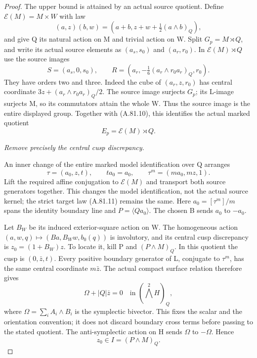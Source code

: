 \begin{proof}
The upper bound is attained by an actual source quotient.
Define \(\mathcal E(M)=M\times W\) with law
\[
                 (a,z)(b,w)=(a+b,z+w+\tfrac12(a\wedge b)_Q),
 \tag{A.81.11}
\]
and give Q its natural action on M and trivial action on
W. Split \(G_p=M\rtimes Q\), and write its actual
source elements as \((a_s,s_0)\) and \((a_r,r_0)\).
In \(\mathcal E(M)\rtimes Q\) use the source images
\[
 S=(a_s,0,s_0),\qquad
 R=(a_r,-\tfrac16(a_r\wedge r_0a_r)_Q,r_0).
 \tag{A.81.12}
\]
They have orders two and three. Indeed the cube of
\((a_r,z,r_0)\) has central coordinate
\(3z+(a_r\wedge r_0a_r)_Q/2\). The source image
surjects \(G_p\); its L-image surjects M, so its
commutators attain the whole W. Thus the source image is
the entire displayed group. Together with (A.81.10),
this identifies the actual marked quotient
\[
                         E_p=\mathcal E(M)\rtimes Q.
 \tag{A.81.13}
\]

\emph{Remove precisely the central cusp discrepancy.}\par
An inner change of the entire marked model identification
over Q arranges
\[
             \tau=(a_0,z,t),\qquad ta_0=a_0,
             \qquad \tau^m=(ma_0,mz,1).
 \tag{A.81.14}
\]
Lift the required affine conjugation to \(\mathcal E(M)\)
and transport both source generators together. This changes
the model identification, not the actual source kernel;
the strict target law (A.81.11) remains the same.
Here \(a_0=[\tau^m]/m\) spans the identity boundary
line and \(P=\langle Q a_0\rangle\). The chosen B
sends \(a_0\) to \(-a_0\).

Let \(B_W\) be its induced exterior-square action on W.
The homogeneous action
\((a,w,q)\mapsto(Ba,B_Ww,b_0(q))\) is involutory,
and its central cusp discrepancy is
\(z_0=(1+B_W)z\). To locate it, kill P and
\((P\wedge M)_Q\). In this quotient the cusp is
\((0,\bar z,t)\). Every positive boundary generator
of L, conjugate to \(\tau^m\), has the same central
coordinate \(m\bar z\). The actual compact surface
relation therefore gives
\[
                 \Omega+|Q|\bar z=0
                 \quad\text{in }(\bigwedge^2H)_Q,
 \tag{A.81.15}
\]
where \(\Omega=\sum_i A_i\wedge B_i\) is the
symplectic bivector. This fixes the scalar and the
orientation convention; it does not discard boundary
cross terms before passing to the stated quotient.
The anti-symplectic action on H sends \(\Omega\) to
\(-\Omega\). Hence
\[
                         z_0\in I=(P\wedge M)_Q.
 \tag{A.81.16}
\]


\end{proof}
